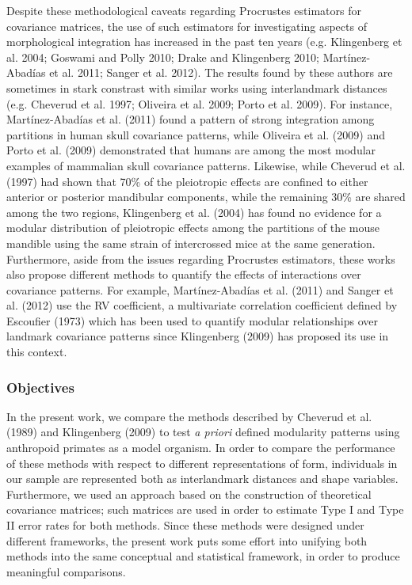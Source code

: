 \documentclass[12pt,]{article}
\begin{document}
Despite these methodological caveats regarding Procrustes estimators for
covariance matrices, the use of such estimators for investigating
aspects of morphological integration has increased in the past ten years
(e.g. Klingenberg et al. 2004; Goswami and Polly 2010; Drake and
Klingenberg 2010; Martínez-Abadías et al. 2011; Sanger et al. 2012). The
results found by these authors are sometimes in stark constrast with
similar works using interlandmark distances (e.g. Cheverud et al. 1997;
Oliveira et al. 2009; Porto et al. 2009). For instance, Martínez-Abadías
et al. (2011) found a pattern of strong integration among partitions in
human skull covariance patterns, while Oliveira et al. (2009) and Porto
et al. (2009) demonstrated that humans are among the most modular
examples of mammalian skull covariance patterns. Likewise, while
Cheverud et al. (1997) had shown that 70\% of the pleiotropic effects
are confined to either anterior or posterior mandibular components,
while the remaining 30\% are shared among the two regions, Klingenberg
et al. (2004) has found no evidence for a modular distribution of
pleiotropic effects among the partitions of the mouse mandible using the
same strain of intercrossed mice at the same generation. Furthermore,
aside from the issues regarding Procrustes estimators, these works also
propose different methods to quantify the effects of interactions over
covariance patterns. For example, Martínez-Abadías et al. (2011) and
Sanger et al. (2012) use the RV coefficient, a multivariate correlation
coefficient defined by Escoufier (1973) which has been used to quantify
modular relationships over landmark covariance patterns since
Klingenberg (2009) has proposed its use in this context.

\subsubsection{Objectives}\label{objectives}

In the present work, we compare the methods described by Cheverud et al.
(1989) and Klingenberg (2009) to test \emph{a priori} defined modularity
patterns using anthropoid primates as a model organism. In order to
compare the performance of these methods with respect to different
representations of form, individuals in our sample are represented both
as interlandmark distances and shape variables. Furthermore, we used an
approach based on the construction of theoretical covariance matrices;
such matrices are used in order to estimate Type I and Type II error
rates for both methods. Since these methods were designed under
different frameworks, the present work puts some effort into unifying
both methods into the same conceptual and statistical framework, in
order to produce meaningful comparisons.
\end{document}
